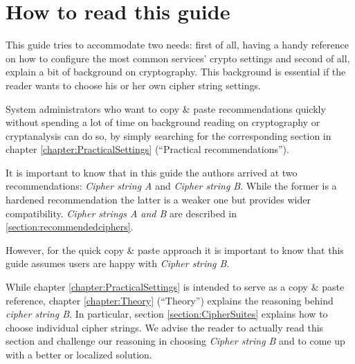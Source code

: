 \section{How to read this guide}
\label{sec:how-read-this}
This guide tries to accommodate two needs: first of all, having a handy reference on how to configure the most common services' crypto settings and second of all, explain a bit of background on cryptography. This background is essential if the reader wants to choose his or her own cipher string settings.

System administrators who want to copy \& paste recommendations quickly without
spending a lot of time on background reading on cryptography or cryptanalysis
can do so, by simply searching for the corresponding section in chapter
\ref{chapter:PracticalSettings} (``Practical recommendations''). 

It is important to know that in this guide the authors arrived at two recommendations: \textit{Cipher string A} and \textit{Cipher string B}. While the former is a hardened recommendation the latter is a weaker one but provides wider compatibility.
\textit{Cipher strings A and B} are described in \ref{section:recommendedciphers}. 


However, for the quick copy \& paste approach it is important to know that this
guide assumes users are happy with \textit{Cipher string B}. 


While chapter \ref{chapter:PracticalSettings} is intended to serve as a copy \& paste reference, chapter \ref{chapter:Theory} (``Theory'') explains the reasoning behind \textit{cipher string B}. In particular, section \ref{section:CipherSuites} explains how to choose individual cipher strings. We advise the reader to actually read this section and challenge our reasoning in choosing \textit{Cipher string B} and to come up with a better  or localized solution.


